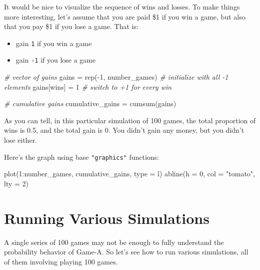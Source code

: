 \documentclass[
]{book}
\newenvironment{Shaded}{\begin{snugshade}}{\end{snugshade}}
\newcommand{\AttributeTok}[1]{\textcolor[rgb]{0.77,0.63,0.00}{#1}}
\newcommand{\CommentTok}[1]{\textcolor[rgb]{0.56,0.35,0.01}{\textit{#1}}}
\newcommand{\DecValTok}[1]{\textcolor[rgb]{0.00,0.00,0.81}{#1}}
\newcommand{\FunctionTok}[1]{\textcolor[rgb]{0.00,0.00,0.00}{#1}}
\newcommand{\NormalTok}[1]{#1}
\newcommand{\OtherTok}[1]{\textcolor[rgb]{0.56,0.35,0.01}{#1}}
\newcommand{\SpecialCharTok}[1]{\textcolor[rgb]{0.00,0.00,0.00}{#1}}
\newcommand{\StringTok}[1]{\textcolor[rgb]{0.31,0.60,0.02}{#1}}
\begin{document}
It would be nice to visualize the sequence of wins and losses. To make things
more interesting, let's assume that you are paid \$1 if you win a game, but also
that you pay \$1 if you lose a game. That is:

\begin{itemize}
\item
  gain \texttt{1} if you win a game
\item
  gain \texttt{-1} if you lose a game
\end{itemize}

\begin{Shaded}
\begin{Highlighting}[]
\CommentTok{\# vector of gains}
\NormalTok{gains }\OtherTok{=} \FunctionTok{rep}\NormalTok{(}\SpecialCharTok{{-}}\DecValTok{1}\NormalTok{, number\_games)  }\CommentTok{\# initialize with all {-}1 elements}
\NormalTok{gains[wins] }\OtherTok{=} \DecValTok{1}                \CommentTok{\# switch to +1 for every win}

\CommentTok{\# cumulative gains}
\NormalTok{cumulative\_gains }\OtherTok{=} \FunctionTok{cumsum}\NormalTok{(gains)}
\end{Highlighting}
\end{Shaded}

As you can tell, in this particular simulation of 100 games, the total
proportion of wins is 0.5, and the total gain is
0. You didn't gain any money, but you didn't
lose either.

Here's the graph using base \texttt{"graphics"} functions:

\begin{Shaded}
\begin{Highlighting}[]
\FunctionTok{plot}\NormalTok{(}\DecValTok{1}\SpecialCharTok{:}\NormalTok{number\_games, cumulative\_gains, }\AttributeTok{type =} \StringTok{\textquotesingle{}l\textquotesingle{}}\NormalTok{)}
\FunctionTok{abline}\NormalTok{(}\AttributeTok{h =} \DecValTok{0}\NormalTok{, }\AttributeTok{col =} \StringTok{"tomato"}\NormalTok{, }\AttributeTok{lty =} \DecValTok{2}\NormalTok{)}
\end{Highlighting}
\end{Shaded}

\hypertarget{running-various-simulations}{%
\chapter{Running Various Simulations}\label{running-various-simulations}}

A single series of 100 games may not be enough to fully
understand the probability behavior of Game-A. So let's see how to run various
simulations, all of them involving playing 100 games.
\end{document}

